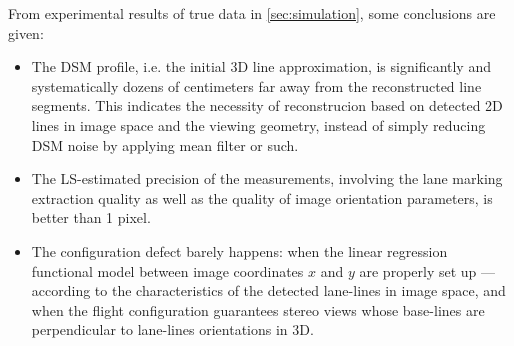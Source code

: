 From experimental results of true data in \cref{sec:simulation}, some conclusions are given:
\begin{itemize}
	\item The DSM profile, i.e. the initial 3D line approximation, is significantly and systematically dozens of centimeters far away from the reconstructed line segments. This indicates the necessity of reconstrucion based on detected 2D lines in image space and the viewing geometry, instead of simply reducing DSM noise by applying mean filter or such.
	
	\item The LS-estimated precision of the measurements, involving the lane marking extraction quality as well as the quality of image orientation parameters, is better than 1 pixel.

	\item The configuration defect %
	barely happens: when the linear regression functional model between image coordinates $x$ and $y$ are properly set up ---according to the characteristics of the detected lane-lines in image space, and when the flight configuration guarantees stereo views whose base-lines are perpendicular to lane-lines orientations in 3D.
	
	
\end{itemize}




